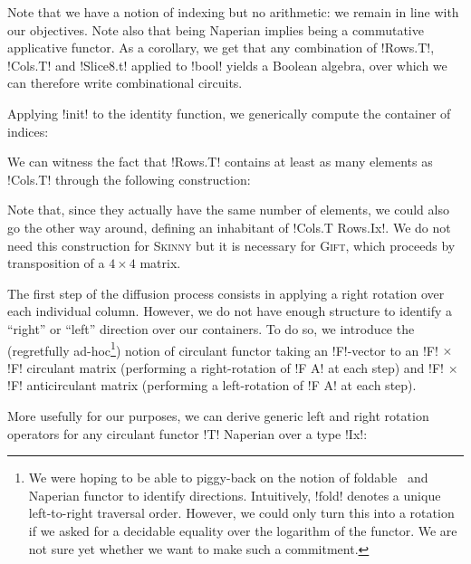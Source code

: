 \documentclass[draft,english]{jflart}
\newcommand{\Skinny}{\textsc{Skinny}}
\newcommand{\Gift}{\textsc{Gift}}
\begin{document}
Note that we have a notion of indexing but no arithmetic: we remain in
line with our objectives. Note also that being Naperian implies being
a commutative applicative functor. As a corollary, we get that any
combination of \coqe!Rows.T!, \coqe!Cols.T! and \coqe!Slice8.t!
applied to \coqe!bool! yields a Boolean algebra, over which we can
therefore write combinational circuits.


Applying \coqe!init! to the identity function, we generically compute
the container of indices:
%

We can witness the fact that \coqe!Rows.T! contains at least as many
elements as \coqe!Cols.T! through the following construction:
%

Note that, since they actually have the same number of elements, we
could also go the other way around, defining an inhabitant of
\coqe!Cols.T Rows.Ix!. We do not need this construction for \Skinny{}
but it is necessary for \Gift{}, which proceeds by transposition of a
$4 \times 4$ matrix.


The first step of the diffusion process consists in applying a right
rotation over each individual column. However, we do not have enough
structure to identify a ``right'' or ``left'' direction over our
containers. To do so, we introduce the (regretfully ad-hoc\footnote{We
were hoping to be able to piggy-back on the notion of
foldable~\citep{yorgey:typeclassopedia} and Naperian functor to
identify directions. Intuitively, \coqe!fold! denotes a unique
left-to-right traversal order. However, we could only turn this into a
rotation if we asked for a decidable equality over the logarithm of
the functor. We are not sure yet whether we want to make such a
commitment.}) notion of circulant functor
%
%
taking an \coqe!F!-vector to an \coqe!F! $\times$ \coqe!F! circulant
matrix (performing a right-rotation of \coqe!F A! at each step) and
\coqe!F! $\times$ \coqe!F! anticirculant matrix (performing a
left-rotation of \coqe!F A! at each step).

More usefully for our purposes, we can derive generic left and right
rotation operators for any circulant functor \coqe!T!  Naperian over a
type \coqe!Ix!:
%
\end{document}
